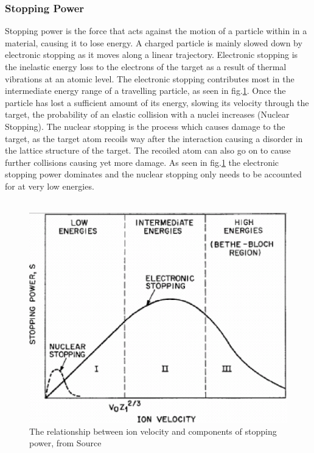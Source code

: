 \documentclass[12pt,a4paper]{article}
\begin{document}
\subsubsection{Stopping Power}
\label{stop}
Stopping power is the force that acts against the motion of a particle within in a material, causing it to lose energy. A charged particle is mainly slowed down by electronic stopping as it moves along a linear trajectory. Electronic stopping is the inelastic energy loss to the electrons of the target as a result of thermal vibrations at an atomic level. The electronic stopping contributes most in the intermediate energy range of a travelling particle, as seen in fig.\ref{stprg}. Once the particle has lost a sufficient amount of its energy, slowing its velocity through the target, the probability of an elastic collision with a nuclei increases (Nuclear Stopping). The nuclear stopping is the process which causes damage to the target, as the target atom recoils way after the interaction causing a disorder in the lattice structure of the target. The recoiled atom can also go on to cause further collisions causing yet more damage. As seen in fig.\ref{stprg} the electronic stopping power dominates and the nuclear stopping only needs to be accounted for at very low energies.
\\\\
\begin{figure}[h!]
\centering
\includegraphics[scale=0.4]{Images//Stopping//stoppingrange.png}
\caption[width=\columnwidth]{The relationship between ion velocity and components of stopping power, from Source \cite{stprg}}
\label{stprg}
\end{figure}
\end{document}
